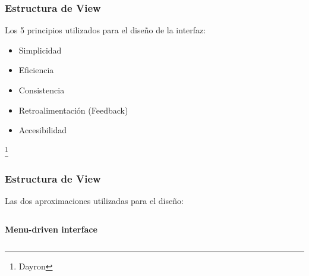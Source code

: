 \documentclass[14pt]{beamer}
\begin{document}
\begin{frame}
\frametitle{Estructura de View}
Los 5 principios utilizados para el diseño de la interfaz:
\begin{itemize}
\item Simplicidad
\item Eficiencia
\item Consistencia
\item Retroalimentación (Feedback)
\item Accesibilidad
\end{itemize}
\footnote{Dayron}
\end{frame}

\begin{frame}
\frametitle{Estructura de View}
Las dos aproximaciones utilizadas para el diseño:

\begin{columns}
\begin{column}{0.5\textwidth}
\textbf{Menu-driven interface}
\begin{center}


\end{center}
\end{column}
\end{columns}
\end{frame}
\end{document}
